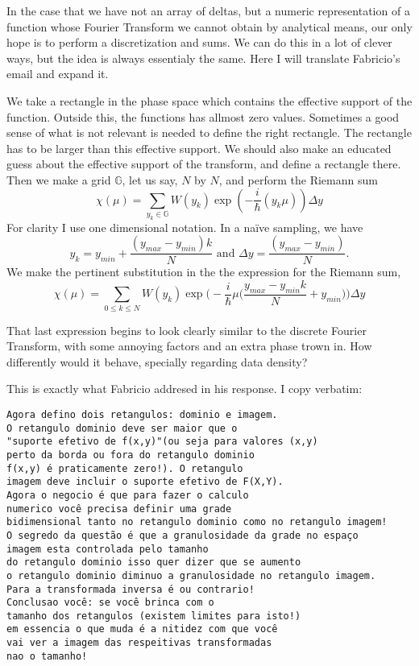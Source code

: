 \documentclass[a4paper,12pt]{article}
\newcommand{\ihb}{\frac{i}{\hbar}}
\begin{document}
In the case that we have not an array of deltas, but a numeric representation
of a function whose Fourier Transform we cannot obtain by analytical means, our
only hope is to perform a discretization and sums. We can do this in a lot
of clever ways, but the idea is always essentialy the same. Here I will
translate Fabricio's email and expand it.

We take a rectangle in the phase space which contains the
effective support of the function. Outside this, the functions has allmost zero
values. Sometimes a good sense of what is not relevant is needed to define
the right rectangle. The rectangle has to be larger than this effective support.
We should also make an educated guess about the effective support of the
transform, and define a rectangle there. Then we make a grid $\mathbb{G}$, 
let us say,
$N$ by $N$, and perform the Riemann sum 
\begin{equation}
\chi(\mu)=\sum_{y_k \in \mathbb{G}} W(y_k) \exp(-\ihb  (y_k \mu)) \Delta y
\end{equation}
For clarity I use one dimensional notation.
In a na\"ive sampling, we have
\begin{equation}
y_k=y_{min}+\frac{(y_{max} -y_{min})k}{N} \text{ and } 
\Delta y = \frac{(y_{max} -y_{min})}{N}.
\end{equation}
We make the pertinent substitution in the the expression for the 
Riemann sum,
\begin{equation}
\chi(\mu)=\sum_{0\leq k \le N} W(y_k) 
\exp \Big(-\ihb \mu
\big(\frac{y_{max}-y_{min} k }{N} +y_{min}\big) \Big) 
\Delta y
\end{equation}

That last expression begins to look clearly similar to the discrete Fourier Transform,
with some annoying factors and an extra phase trown in. How differently
would it behave, specially regarding data density?

This is exactly what Fabricio addresed in his response. I copy verbatim:
\begin{verbatim}
Agora defino dois retangulos: dominio e imagem. 
O retangulo dominio deve ser maior que o 
"suporte efetivo de f(x,y)"(ou seja para valores (x,y) 
perto da borda ou fora do retangulo dominio 
f(x,y) é praticamente zero!). O retangulo 
imagem deve incluir o suporte efetivo de F(X,Y).
Agora o negocio é que para fazer o calculo 
numerico você precisa definir uma grade 
bidimensional tanto no retangulo dominio como no retangulo imagem!
O segredo da questão é que a granulosidade da grade no espaço 
imagem esta controlada pelo tamanho 
do retangulo dominio isso quer dizer que se aumento 
o retangulo dominio diminuo a granulosidade no retangulo imagem. 
Para a transformada inversa é ou contrario!
Conclusao você: se você brinca com o 
tamanho dos retangulos (existem limites para isto!)
em essencia o que muda é a nitidez com que você 
vai ver a imagem das respeitivas transformadas 
nao o tamanho!
\end{verbatim}
\end{document}
